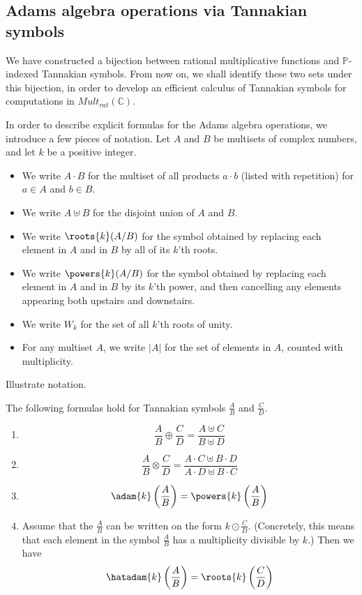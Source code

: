 \documentclass[a4paper]{article}
\begin{document}
\subsection{Adams algebra operations via Tannakian symbols}

We have constructed a bijection between rational multiplicative functions and $\mathbb{P}$-indexed Tannakian symbols. From now on, we shall identify these two sets under this bijection, in order to develop an efficient calculus of Tannakian symbols for computations in $Mult_{rat}(\mathbb{C})$.

In order to describe explicit formulas for the Adams algebra operations, we introduce a few pieces of notation. Let $A$ and $B$ be multisets of complex numbers, and let $k$ be a positive integer.

\begin{itemize}
\item We write $A \cdot B$ for the multiset of all products $a \cdot b$ (listed with repetition) for $a \in A$ and $b \in B$.
\item We write $A \uplus B $ for the disjoint union of $A$ and $B$.
\item We write $\roots{k}(A/B)$ for the symbol obtained by replacing each element in $A$ and in $B$ by all of its $k$'th roots.
\item We write $\powers{k}(A/B)$ for the symbol obtained by replacing each element in $A$ and in $B$ by its $k$'th power, and then cancelling any elements appearing both upstairs and downstairs.
\item We write $W_k$ for the set of all $k$'th roots of unity.
\item For any multiset $A$, we write $\vert A \vert$ for the set of elements in $A$, counted with multiplicity.
\end{itemize}

\begin{example}
Illustrate notation.
\end{example}

\begin{theorem}
The following formulas hold for Tannakian symbols $\frac{A}{B}$ and $\frac{C}{D}$.
\begin{enumerate}
\item $$\frac{A}{B} \oplus \frac{C}{D} = \frac{A \uplus C}{B \uplus D}$$
\item $$\frac{A}{B} \otimes \frac{C}{D} = \frac{ A \cdot C \uplus B \cdot D }{ A \cdot D \uplus B \cdot C }$$
\item $$\adam{k} \left(\frac{A}{B} \right) = \powers{k} \left(\frac{A}{B} \right)$$
\item Assume that the $\frac{A}{B}$ can be written on the form $k \odot \frac{C}{D}$. (Concretely, this means that each element in the symbol $\frac{A}{B}$ has a multiplicity divisible by $k$.) Then we have
$$ \hatadam{k}\left(\frac{A}{B}\right) = \roots{k} \left( \frac{C}{D} \right)  $$
\end{enumerate}
\end{theorem}
\end{document}
